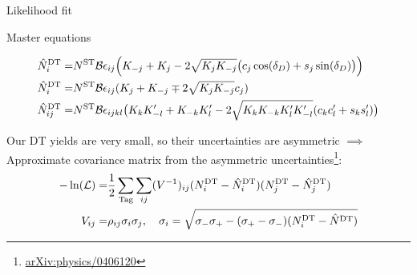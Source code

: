\documentclass{beamer}
\begin{document}
\begin{frame}{Likelihood fit}
  \begin{block}{Master equations}
    \begin{center}
      \vspace{-0.5cm}
      \begin{align*}
        \hat{N}^{\rm DT}_i =& N^{\rm ST}\mathcal{B}\epsilon_{ij}\Big(K_{-j} + K_j - 2\sqrt{K_jK_{-j}}\big(c_j\cos(\delta_D) + s_j\sin(\delta_D)\big)\Big) \\
        \hat{N}^{\rm DT}_i =& N^{\rm ST}\mathcal{B}\epsilon_{ij}(K_j + K_{-j} \mp 2\sqrt{K_jK_{-j}}c_j) \\
        \hat{N}^{\rm DT}_{ij} =& N^{\rm ST}\mathcal{B}\epsilon_{ijkl}\big(K_{k}K_{-l}^\prime + K_{-k}K_{l}^\prime - 2\sqrt{K_{k}K_{-k}K_{l}^\prime K_{-l}^\prime}(c_{k}c_{l}^\prime + s_{k}s_{l}^\prime)\big)
      \end{align*}
    \end{center}
  \end{block}
  \vspace{0.5cm}
  \begin{center}
    Our DT yields are very small, so their uncertainties are asymmetric $\implies$\\
    Approximate covariance matrix from the asymmetric uncertainties\footnote{\href{https://arxiv.org/abs/physics/0406120}{arXiv:physics/0406120}}:
    \begin{align*}
      -\ln(\mathcal{L}) =& \frac{1}{2}\sum_{\rm Tag}\sum_{ij}(V^{-1})_{ij}(N^{\rm DT}_i - \hat{N}^{\rm DT}_i)(N^{\rm DT}_j - \hat{N}^{\rm DT}_j) \\
      V_{ij} =& \rho_{ij}\sigma_i\sigma_j, \quad \sigma_i = \sqrt{\sigma_-\sigma_+ - (\sigma_+ - \sigma_-)(N^{\rm DT}_i - \hat{N}^{\rm DT})}
    \end{align*}
  \end{center}
\end{frame}
\end{document}
